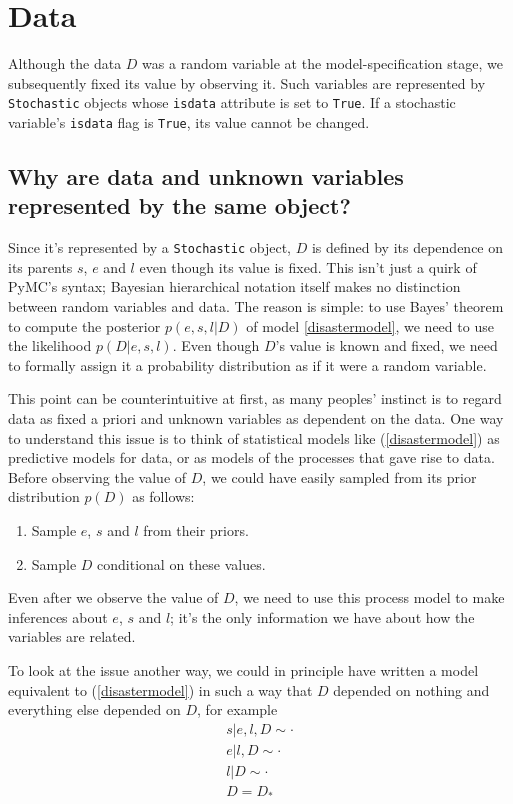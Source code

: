 \section{Data}

Although the data $D$ was a random variable at the model-specification stage, we subsequently fixed its value by observing it. Such variables are represented by \texttt{Stochastic} objects whose \texttt{isdata} attribute is set to \texttt{True}. If a stochastic variable's \texttt{isdata} flag is \texttt{True}, its value cannot be changed.

\subsection{Why are data and unknown variables represented by the same object?}
Since it's represented by a \texttt{Stochastic} object, $D$ is defined by its dependence on its parents $s$, $e$ and $l$ even though its value is fixed. This isn't just a quirk of PyMC's syntax; Bayesian hierarchical notation itself makes no distinction between random variables and data. The reason is simple: to use Bayes' theorem to compute the posterior $p(e,s,l|D)$ of model \ref{disastermodel}, we need to use the likelihood $p(D|e,s,l)$. Even though $D$'s value is known and fixed, we need to formally assign it a probability distribution as if it were a random variable.

This point can be counterintuitive at first, as many peoples' instinct is to regard data as fixed a priori and unknown variables as dependent on the data. One way to understand this issue is to think of statistical models like (\ref{disastermodel}) as predictive models for data, or as models of the processes that gave rise to data. Before observing the value of $D$, we could have easily sampled from its prior distribution $p(D)$ as follows:
\begin{enumerate}
    \item Sample $e$, $s$ and $l$ from their priors.
    \item Sample $D$ conditional on these values.
\end{enumerate}
Even after we observe the value of $D$, we need to use this process model to make inferences about $e$, $s$ and $l$; it's the only information we have about how the variables are related.

\medskip
To look at the issue another way, we could in principle have written a model equivalent to (\ref{disastermodel}) in such a way that $D$ depended on nothing and everything else depended on $D$, for example
\begin{eqnarray*}
    s|e,l,D\sim\cdot\\
    e|l,D\sim\cdot\\
    l|D\sim\cdot\\
    D=D_*
\end{eqnarray*}

